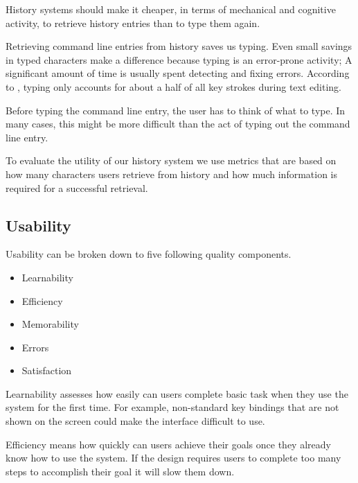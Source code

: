 History systems should make it cheaper, in terms of mechanical and cognitive activity, to retrieve history entries than to type them again.\cite{greenberg1993computer}

Retrieving command line entries from history saves us typing. Even small savings in typed characters make a difference because typing is an error-prone activity; A significant amount of time is usually spent detecting and fixing errors. According to \cite{whiteside1982people}, typing only accounts for about a half of all key strokes during text editing. 


Before typing the command line entry, the user has to think of what to type. In many cases, this might be more difficult than the act of typing out the command line entry.   


To evaluate the utility of our history system we use metrics that are based on how many characters users retrieve from history and how much information is required for a successful retrieval.

\subsection{Usability}

Usability can be broken down to five following quality components.\cite{nielsen2012usability}

\begin{itemize}
    \item Learnability
    \item Efficiency
    \item Memorability
    \item Errors
    \item Satisfaction
\end{itemize}

Learnability assesses how easily can users complete basic task when they use the system for the first time. For example, non-standard key bindings that are not shown on the screen could make the interface difficult to use.

Efficiency means how quickly can users achieve their goals once they already know how to use the system. If the design requires users to complete too many steps to accomplish their goal it will slow them down. 

